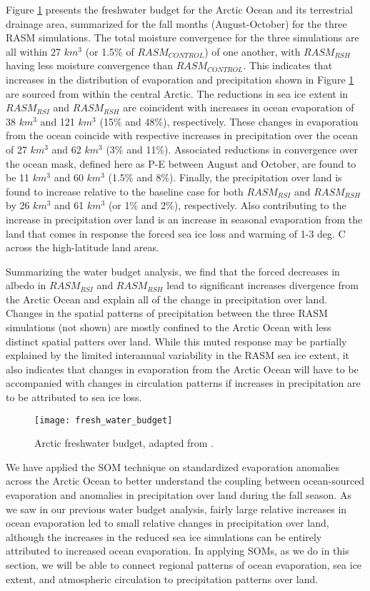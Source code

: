 Figure \ref{fig:fwb} presents the freshwater budget for the Arctic Ocean and its terrestrial drainage area, summarized for the fall months (August-October) for the three RASM simulations.
The total moisture convergence for the three simulations are all within 27 $km^3$ (or 1.5\% of $RASM_{CONTROL}$) of one another, with $RASM_{RSH}$ having less moisture convergence than $RASM_{CONTROL}$.
This indicates that increases in the distribution of evaporation and precipitation shown in Figure \ref{fig:fwb} are sourced from within the central Arctic.
The reductions in sea ice extent in $RASM_{RSI}$ and $RASM_{RSH}$ are coincident with increases in ocean evaporation of 38 $km^3$ and 121 $km^3$ (15\% and 48\%), respectively.
These changes in evaporation from the ocean coincide with respective increases in precipitation over the ocean of 27 $km^3$ and 62 $km^3$ (3\% and 11\%).
Associated reductions in convergence over the ocean mask, defined here as P-E between August and October, are found to be 11 $km^3$ and 60 $km^3$ (1.5\% and 8\%).
Finally, the precipitation over land is found to increase relative to the baseline case for both $RASM_{RSI}$ and $RASM_{RSH}$ by 26 $km^3$ and 61 $km^3$ (or 1\% and 2\%), respectively.
Also contributing to the increase in precipitation over land is an increase in seasonal evaporation from the land that comes in response the forced sea ice loss and warming of 1-3 deg. C across the high-latitude land areas.

Summarizing the water budget analysis, we find that the forced decreases in albedo in $RASM_{RSI}$ and $RASM_{RSH}$ lead to significant increases divergence from the Arctic Ocean and explain all of the change in precipitation over land.
Changes in the spatial patterns of precipitation between the three RASM simulations (not shown) are mostly confined to the Arctic Ocean with less distinct spatial patters over land.
While this muted response may be partially explained by the limited interannual variability in the RASM sea ice extent, it also indicates that changes in evaporation from the Arctic Ocean will have to be accompanied with changes in circulation patterns if increases in precipitation are to be attributed to sea ice loss.

\begin{figure}
  \centering
  \texttt{[image: fresh\_water\_budget]}
  \caption{Arctic freshwater budget, adapted from \citet{Serreze_2006a}.}
  \label{fig:fwb}
\end{figure}

We have applied the SOM technique on standardized evaporation anomalies across the Arctic Ocean to better understand the coupling between ocean-sourced evaporation and anomalies in precipitation over land during the fall season.
As we saw in our previous water budget analysis, fairly large relative increases in ocean evaporation led to small relative changes in precipitation over land, although the increases in the reduced sea ice simulations can be entirely attributed to increased ocean evaporation.
In applying SOMs, as we do in this section, we will be able to connect regional patterns of ocean evaporation, sea ice extent, and atmospheric circulation to precipitation patterns over land.

